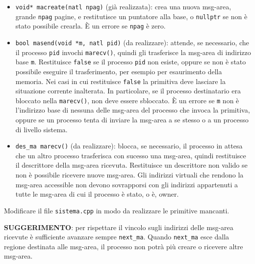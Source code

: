 \begin{itemize}
  \item \verb|void* macreate(natl npag)| (gi\`a realizzata): crea una nuova msg-area, grande \verb|npag| pagine,
    e restitutisce un puntatore alla base, o \verb|nullptr| se non
    \`e stato possibile crearla. \`E un errore se \verb|npag| \`e zero.
  \item \verb|bool masend(void *m, natl pid)| (da realizzare): attende, se necessario, che il processo \verb|pid| 
    invochi \verb|marecv()|, quindi gli trasferisce la msg-area di indirizzo base \verb|m|.
        Restituisce \verb|false| se il processo \verb|pid| non esiste, oppure se non \`e stato possibile
	eseguire il trasferimento, per esempio per esaurimento della memoria. Nei casi in cui restituisce \verb|false| la primitiva deve lasciare
	la situazione corrente inalterata. In particolare, se il processo destinatario era bloccato nella \verb|marecv()|, non
      deve essere sbloccato. \`E un errore se \verb|m| non \`e l'indirizzo base di nessuna delle msg-area del processo che invoca
      la primitiva, oppure se un processo tenta di inviare la msg-area a se stesso o a un processo di livello sistema.
    \item \verb|des_ma marecv()| (da realizzare): blocca, se necessario, il processo in attesa che un altro processo
      trasferisca con sucesso una msg-area, quindi restituisce il descrittore della msg-area ricevuta. Restituisce un descrittore
      non valido se non \`e possibile ricevere nuove msg-area. Gli indirizzi virtuali che rendono la msg-area accessible non
      devono sovrapporsi con gli indirizzi appartenuti a tutte le msg-area di cui il processo \`e stato, o \`e, owner.
\end{itemize}

Modificare il file \verb|sistema.cpp| in modo da realizzare le primitive mancanti.

{\bf SUGGERIMENTO}: per rispettare il vincolo sugli indirizzi delle msg-area ricevute \`e sufficiente avanzare sempre \verb|next_ma|.
Quando \verb|next_ma| esce dalla regione destinata alle msg-area, il processo non potr\`a pi\`u creare o ricevere altre msg-area.
